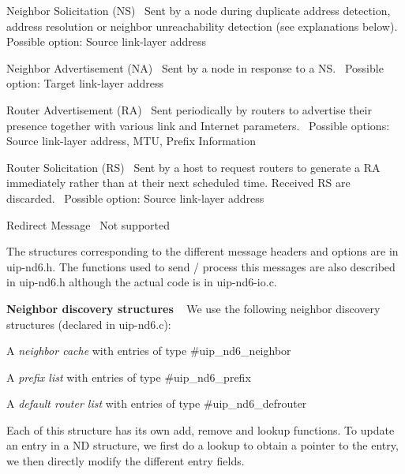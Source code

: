 \begin{DoxyItemize}
\item Neighbor Solicitation (NS)~\newline
Sent by a node during duplicate address detection, address resolution or neighbor unreachability detection (see explanations below).~\newline
Possible option\+: Source link-\/layer address \item Neighbor Advertisement (NA)~\newline
Sent by a node in response to a NS.~\newline
Possible option\+: Target link-\/layer address \item Router Advertisement (RA)~\newline
Sent periodically by routers to advertise their presence together with various link and Internet parameters.~\newline
Possible options\+: Source link-\/layer address, M\+TU, Prefix Information \item Router Solicitation (RS)~\newline
Sent by a host to request routers to generate a RA immediately rather than at their next scheduled time. Received RS are discarded.~\newline
Possible option\+: Source link-\/layer address \item Redirect Message~\newline
Not supported\end{DoxyItemize}
The structures corresponding to the different message headers and options are in uip-\/nd6.\+h. The functions used to send / process this messages are also described in uip-\/nd6.\+h although the actual code is in uip-\/nd6-\/io.\+c.

{\bfseries Neighbor discovery structures }~\newline
 We use the following neighbor discovery structures (declared in uip-\/nd6.\+c)\+: \begin{DoxyItemize}
\item A {\itshape neighbor cache} with entries of type \#uip\+\_\+nd6\+\_\+neighbor \item A {\itshape prefix list} with entries of type \#uip\+\_\+nd6\+\_\+prefix \item A {\itshape default router list} with entries of type \#uip\+\_\+nd6\+\_\+defrouter\end{DoxyItemize}
Each of this structure has its own add, remove and lookup functions. To update an entry in a ND structure, we first do a lookup to obtain a pointer to the entry, we then directly modify the different entry fields.

